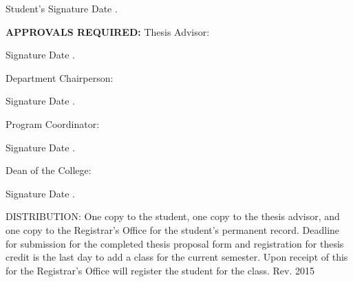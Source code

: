 \documentclass{article}
\begin{document}
\begin{flushright}
\underline{\hspace{15em}} \underline{\hspace{10em}}\linebreak
Student's Signature \hspace{2.1cm} Date \hspace{2.4cm} {\color{white} .}
\end{flushright}
\begin{flushleft}
\textbf{APPROVALS REQUIRED:} \linebreak
Thesis Advisor:
\begin{flushright}
\underline{\hspace{15em}} \underline{\hspace{10em}}\linebreak
Signature \hspace{3.7cm} Date\hspace{2.5cm} {\color{white} .}\linebreak
\end{flushright}
Department Chairperson:
\begin{flushright}
\underline{\hspace{15em}} \underline{\hspace{10em}}\linebreak
Signature \hspace{3.7cm} Date\hspace{2.5cm} {\color{white} .}\linebreak
\end{flushright}
Program Coordinator:
\begin{flushright}
\underline{\hspace{15em}} \underline{\hspace{10em}}\linebreak
Signature \hspace{3.7cm} Date\hspace{2.5cm} {\color{white} .}\linebreak
\end{flushright}
Dean of the College:
\begin{flushright}
\underline{\hspace{15em}} \underline{\hspace{10em}}\linebreak
Signature \hspace{3.7cm} Date\hspace{2.5cm} {\color{white} .}\linebreak
\end{flushright}
\end{flushleft}
\begin{flushleft}
DISTRIBUTION: One copy to the student, one copy to the thesis advisor, and one copy to the Registrar’s Office for the student’s permanent record.  Deadline for submission for the completed thesis proposal form and registration for thesis credit is the last day to add a class for the current semester.  Upon receipt of this for the Registrar’s Office will register the student for the class.\linebreak \linebreak 
Rev. 2015
\end{flushleft}
\end{document}
